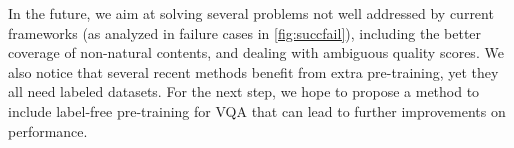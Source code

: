 \documentclass[journal]{IEEEtran}
\begin{document}
In the future, we aim at solving several problems not well addressed by current frameworks (as analyzed in failure cases in \cref{fig:succfail}), including the better coverage of non-natural contents, and dealing with ambiguous quality scores. We also notice that several recent methods benefit from extra pre-training, yet they all need labeled datasets. For the next step, we hope to propose a method to include label-free pre-training for VQA that can lead to further improvements on performance.





\ifCLASSOPTIONcaptionsoff
  \newpage
\fi















\end{document}
